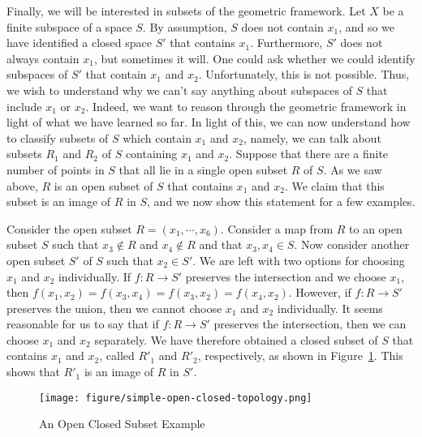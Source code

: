 \documentclass[a4paper,reqno,oneside]{article}
\begin{document}
Finally, we will be interested in subsets of the geometric framework. Let $X$ be a finite subspace of a space $S$. By assumption, $S$ does not contain $x_1$, and so we have identified a closed space $S'$ that contains $x_1$. Furthermore, $S'$ does not always contain $x_1$, but sometimes it will. One could ask whether we could identify subspaces of $S'$ that contain $x_1$ and $x_2$. Unfortunately, this is not possible.
%
Thus, we wish to understand why we can't say anything about subspaces of $S$ that include $x_1$ or $x_2$. Indeed, we want to reason through the geometric framework in light of what we have learned so far. In light of this, we can now understand how to classify subsets of $S$ which contain $x_1$ and $x_2$, namely, we can talk about subsets $R_1$ and $R_2$ of $S$ containing $x_1$ and $x_2$. Suppose that there are a finite number of points in $S$ that all lie in a single open subset $R$ of $S$. As we saw above, $R$ is an open subset of $S$ that contains $x_1$ and $x_2$. We claim that this subset is an image of $R$ in $S$, and we now show this statement for a few examples. 

%
\begin{example} 
    Consider the open subset $R = (x_1, \cdots, x_6)$. Consider a map from $R$ to an open subset $S$ such that $x_3 \notin R$ and $x_4 \notin R$ and that $x_3, x_4 \in S$. Now consider another open subset $S'$ of $S$ such that $x_2 \in S'$. We are left with two options for choosing $x_1$ and $x_2$ individually. If $f: R \to S'$ preserves the intersection and we choose $x_1$, then $f(x_1,x_2) = f(x_3,x_4) = f(x_3,x_2) = f(x_4,x_2)$. However, if $f: R \to S'$ preserves the union, then we cannot choose $x_1$ and $x_2$ individually. It seems reasonable for us to say that if $f: R \to S'$ preserves the intersection, then we can choose $x_1$ and $x_2$ separately. We have therefore obtained a closed subset of $S$ that contains $x_1$ and $x_2$, called $R'_1$ and $R'_2$, respectively, as shown in Figure~\ref{fig:simple-open-closed-topology}. This shows that $R'_1$ is an image of $R$ in $S'$.
\end{example}

%
\begin{figure}[ht]
    \centering
    \texttt{[image: figure/simple-open-closed-topology.png]}
    \caption{An Open Closed Subset Example}
    \label{fig:simple-open-closed-topology}
\end{figure}



%
%
\medskip
\end{document}
